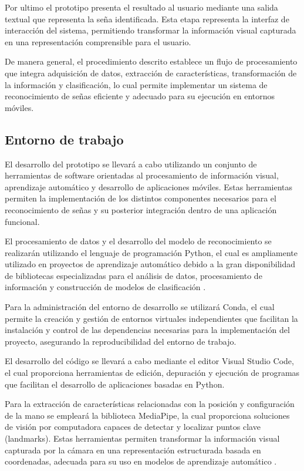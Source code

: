 	Por ultimo el prototipo presenta el resultado al usuario mediante una salida
	textual que representa la seña identificada. Esta etapa representa la
	interfaz de interacción del sistema, permitiendo transformar la información
	visual capturada en una representación comprensible para el usuario.
	
	De manera general, el procedimiento descrito establece un flujo de procesamiento
	que integra adquisición de datos, extracción de características, transformación
	de la información y clasificación, lo cual permite implementar un sistema de
	reconocimiento de señas eficiente y adecuado para su ejecución en entornos
	móviles.
	
	\subsection{Entorno de trabajo}
	
	El desarrollo del prototipo se llevará a cabo utilizando un conjunto de
	herramientas de software orientadas al procesamiento de información visual,
	aprendizaje automático y desarrollo de aplicaciones móviles. Estas
	herramientas permiten la implementación de los distintos componentes
	necesarios para el reconocimiento de señas y su posterior integración
	dentro de una aplicación funcional.
	
	El procesamiento de datos y el desarrollo del modelo de reconocimiento se
	realizarán utilizando el lenguaje de programación Python, el cual es
	ampliamente utilizado en proyectos de aprendizaje automático debido a la
	gran disponibilidad de bibliotecas especializadas para el análisis de datos,
	procesamiento de información y construcción de modelos de clasificación
	\cite{python,geron2019}.
	
	Para la administración del entorno de desarrollo se utilizará Conda, el cual
	permite la creación y gestión de entornos virtuales independientes que
	facilitan la instalación y control de las dependencias necesarias para la
	implementación del proyecto, asegurando la reproducibilidad del entorno de
	trabajo.
	
	El desarrollo del código se llevará a cabo mediante el editor Visual Studio
	Code, el cual proporciona herramientas de edición, depuración y ejecución de
	programas que facilitan el desarrollo de aplicaciones basadas en Python.
	
	Para la extracción de características relacionadas con la posición y
	configuración de la mano se empleará la biblioteca MediaPipe, la cual
	proporciona soluciones de visión por computadora capaces de detectar y
	localizar puntos clave (landmarks). Estas
	herramientas permiten transformar la información visual capturada por la
	cámara en una representación estructurada basada en coordenadas, adecuada
	para su uso en modelos de aprendizaje automático \cite{lugaresi2019mediapipe,zhang2020mediapipehands}.
	
